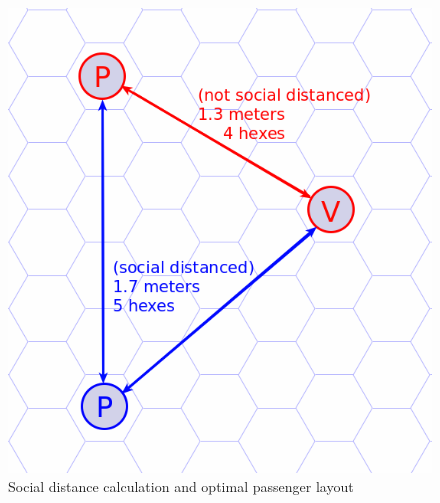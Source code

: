 \documentclass[12pt]{article}
\begin{document}
\begin{figure}[h]
	\centering
	\includegraphics[scale=.35]{./figures/hex-counting.png}
	\caption{Social distance calculation and optimal passenger layout}
	\label{social-distance-measure}
\end{figure}
\end{document}
